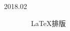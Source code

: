 \begin{tcolorbox}[colback=red!58!white,colframe=red!75!black]
    \begin{description}
        \item [2018.02] ~~\LaTeX 排版 
    \end{description}
\end{tcolorbox}